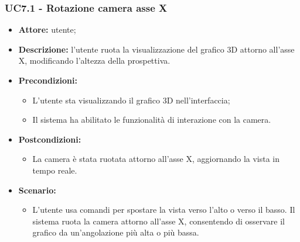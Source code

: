 \subsubsection{UC7.1 - Rotazione camera asse X}
\begin{itemize}
    \item \textbf{Attore:} utente;
    \item \textbf{Descrizione:} l'utente ruota la visualizzazione del grafico 3D attorno all'asse X, modificando l'altezza della prospettiva.
    \item \textbf{Precondizioni:} 
    \begin{itemize}
        \item L'utente sta visualizzando il grafico 3D nell'interfaccia;
        \item Il sistema ha abilitato le funzionalità di interazione con la camera.
    \end{itemize}
    \item \textbf{Postcondizioni:} 
    \begin{itemize}
        \item La camera è stata ruotata attorno all'asse X, aggiornando la vista in tempo reale.
    \end{itemize}
    \item \textbf{Scenario:}
    \begin{itemize}
        \item L'utente usa comandi per spostare la vista verso l'alto o verso il basso. Il sistema ruota la camera attorno all'asse X, consentendo di osservare il grafico da un'angolazione più alta o più bassa.
    \end{itemize}
    
\end{itemize}
